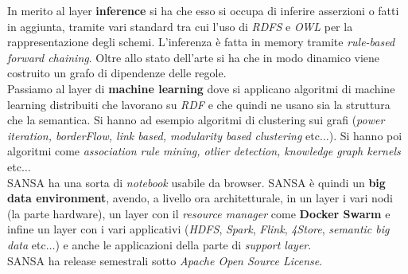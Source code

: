\documentclass[a4paper,12pt, oneside]{book}
\begin{document}
In merito al layer \textbf{inference} si ha che esso si occupa di inferire
asserzioni o fatti in aggiunta, tramite vari standard tra cui  l'uso di
\textit{RDFS} e \textit{OWL} per la rappresentazione degli schemi. L'inferenza è
fatta in memory tramite \textit{rule-based forward chaining}. Oltre allo stato
dell'arte si ha che in modo dinamico viene costruito un grafo di dipendenze
delle regole.\\
Passiamo al layer di \textbf{machine learning} dove si applicano algoritmi di
machine learning distribuiti che lavorano su \textit{RDF} e che quindi ne usano
sia la struttura che la semantica. Si hanno ad esempio algoritmi di clustering
sui grafi (\textit{power iteration, borderFlow, link based, modularity based
  clustering} etc$\ldots$). Si hanno poi algoritmi come \textit{association rule
  mining, otlier detection, knowledge graph kernels} etc$\ldots$\\
SANSA ha una sorta di \textit{notebook} usabile da browser. SANSA è quindi un
\textbf{big data environment}, avendo, a livello ora architetturale, in un layer
i vari nodi (la parte hardware), un layer con il \textit{resource manager} come
\textbf{Docker Swarm} e infine un layer con i vari applicativi (\textit{HDFS},
\textit{Spark}, \textit{Flink}, \textit{4Store}, \textit{semantic big data}
etc$\ldots$) e anche le applicazioni della parte di \textit{support layer}.\\
SANSA ha release semestrali sotto \textit{Apache Open Source License}.
\end{document}
